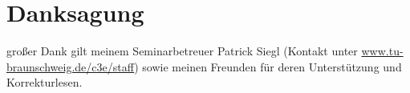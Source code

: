 \documentclass[12pt,journal,compsoc]{IEEEtran}
\begin{document}
  \section*{Danksagung}
\fi


 großer Dank gilt meinem Seminarbetreuer Patrick Siegl (Kontakt unter \url{www.tu-braunschweig.de/c3e/staff}) 
sowie meinen Freunden für deren Unterstützung und Korrekturlesen.


\ifCLASSOPTIONcaptionsoff
  \newpage
\fi






%
%
{
\tiny

}
% 


\end{document}
